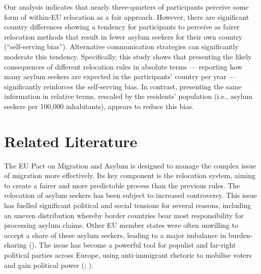 \documentclass[
  12pt,
  a4paper,
]{article}
\begin{document}
Our analysis indicates that nearly three-quarters of participants perceive some form of within-EU relocation as a fair approach. However, there are significant country differences showing a tendency for participants to perceive as fairer relocation methods that result in fewer asylum seekers for their own country (``self-serving bias''). Alternative communication strategies can significantly moderate this tendency. Specifically, this study shows that presenting the likely consequences of different relocation rules in absolute terms --- reporting how many asylum seekers are expected in the participants' country per year --- significantly reinforces the self-serving bias. In contrast, presenting the same information in relative terms, rescaled by the residents' population (i.e., asylum seekers per 100,000 inhabitants), appears to reduce this bias.

\section{Related Literature}\label{related-literature}

The EU Pact on Migration and Asylum is designed to manage the complex issue of migration more effectively. Its key component is the relocation system, aiming to create a fairer and more predictable process than the previous rules. The relocation of asylum seekers has been subject to increased controversy. This issue has fuelled significant political and social tensions for several reasons, including an uneven distribution whereby border countries bear most responsibility for processing asylum claims. Other EU member states were often unwilling to accept a share of these asylum seekers, leading to a major imbalance in burden-sharing (). The issue has become a powerful tool for populist and far-right political parties across Europe, using anti-immigrant rhetoric to mobilise voters and gain political power (; ).
\end{document}
